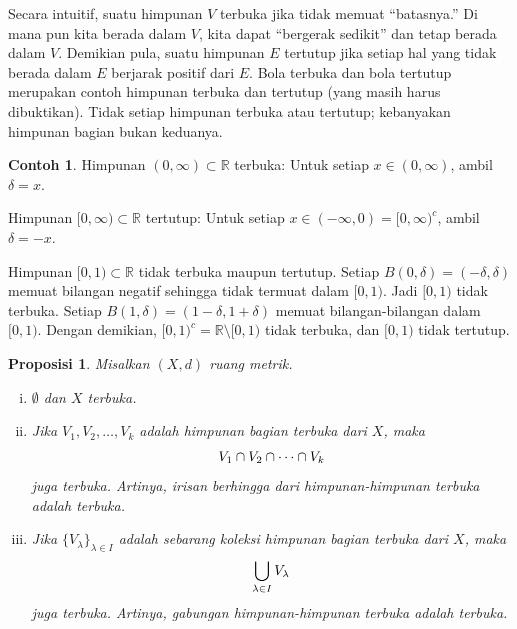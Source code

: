 \documentclass[12pt,openany]{book}
\newcommand{\avoidbreak}{\postdisplaypenalty=100}
\newcommand{\R}{{\mathbb{R}}}
\newcommand{\myquote}[1]{``#1''}
\theoremstyle{plain}
\newtheorem{prop}[thm]{Proposisi}
\theoremstyle{remark}
\theoremstyle{definition}
\theoremstyle{exercise}
\theoremstyle{example}
\newtheorem{example}[thm]{Contoh}
\begin{document}
Secara intuitif, suatu himpunan $V$ terbuka jika tidak memuat
\myquote{batasnya.}
Di mana pun kita berada dalam $V$,
kita dapat \myquote{bergerak sedikit} dan
tetap berada dalam $V$. Demikian pula, suatu himpunan $E$ tertutup jika setiap hal yang tidak berada dalam $E$
berjarak positif dari $E$.
Bola terbuka dan bola tertutup merupakan contoh himpunan terbuka dan tertutup
(yang masih harus dibuktikan).
Tidak setiap himpunan terbuka atau tertutup; kebanyakan himpunan bagian bukan keduanya.

\begin{example}
Himpunan $(0,\infty) \subset \R$ terbuka: Untuk setiap $x \in (0,\infty)$,
ambil $\delta = x$. %

Himpunan $[0,\infty) \subset \R$ tertutup: Untuk setiap $x \in (-\infty,0) =
{[0,\infty)}^c$,
ambil $\delta = -x$. %

Himpunan $[0,1) \subset \R$ tidak terbuka maupun tertutup.
Setiap $B(0,\delta) = (-\delta,\delta)$ memuat bilangan
negatif sehingga tidak termuat dalam $[0,1)$. Jadi $[0,1)$ tidak terbuka.
Setiap $B(1,\delta) = (1-\delta,1+\delta)$ memuat
bilangan-bilangan dalam $[0,1)$.
Dengan demikian, ${[0,1)}^c = \R \setminus
[0,1)$ tidak terbuka, dan $[0,1)$ tidak tertutup.
\end{example}

\begin{prop} \label{prop:topology:open}
Misalkan $(X,d)$ ruang metrik.
\begin{enumerate}[(i)]
\item \label{topology:openi} $\emptyset$ dan $X$ terbuka.
\item \label{topology:openii} Jika $V_1, V_2, \ldots, V_k$ adalah himpunan bagian terbuka dari
$X$, maka
\begin{equation*}
V_1 \cap V_2 \cap \cdots \cap V_k
\avoidbreak
\end{equation*}
juga terbuka. Artinya, irisan berhingga dari himpunan-himpunan terbuka adalah terbuka.
\item \label{topology:openiii} Jika $\{ V_\lambda \}_{\lambda \in I}$ adalah
sebarang koleksi himpunan bagian terbuka dari $X$, maka
\begin{equation*}
\bigcup_{\lambda \in I} V_\lambda
\avoidbreak
\end{equation*}
juga terbuka. Artinya, gabungan himpunan-himpunan terbuka adalah terbuka.
\end{enumerate}
\end{prop}
\end{document}
